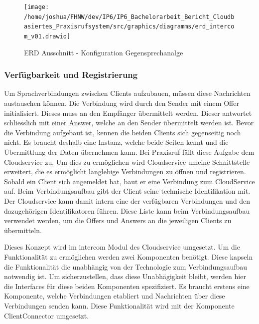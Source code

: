 \begin{figure}[h]
    \centering
    \begin{minipage}[b]{0.7\textwidth}
        \texttt{[image: /home/joshua/FHNW/dev/IP6/IP6\_Bachelorarbeit\_Bericht\_Cloudbasiertes\_Praxisrufsystem/src/graphics/diagramms/erd\_intercom\_v01.drawio]}
        \caption{ERD Ausschnitt - Konfiguration Gegensprechanalge}
    \end{minipage}
\end{figure}




\clearpage
\subsubsection*{Verfügbarkeit und Registrierung}

Um Sprachverbindungen zwischen Clients aufzubauen, müssen diese Nachrichten austauschen können.
Die Verbindung wird durch den Sender mit einem Offer initialisiert.
Dieses muss an den Empfänger übermittelt werden.
Dieser antwortet schliesslich mit einer Answer, welche an den Sender übermittelt werden ist.
Bevor die Verbindung aufgebaut ist, kennen die beiden Clients sich gegenseitig noch nicht.
Es braucht deshalb eine Instanz, welche beide Seiten kennt und die Übermittlung der Daten übernehmen kann.
Bei Praxisruf fällt diese Aufgabe dem Cloudservice zu.
Um dies zu ermöglichen wird Cloudservice umeine Schnittstelle erweitert, die es ermöglicht langlebige Verbindungen
zu öffnen und registrieren.
Sobald ein Client sich angemeldet hat, baut er eine Verbindung zum CloudService auf.
Beim Verbindungsaufbau gibt der Client seine technische Identifikation mit.
Der Cloudservice kann damit intern eine der verfügbaren Verbindungen und den dazugehörigen Identifikatoren führen.
Diese Liste kann beim Verbindungsaufbau verwendet werden, um die Offers und Answers an die jeweiligen Clients zu übermitteln.

Dieses Konzept wird im intercom Modul des Cloudservice umgesetzt.
Um die Funktionalität zu ermöglichen werden zwei Komponenten benötigt.
Diese kapseln die Funktionalität die unabhängig von der Technologie zum Verbindungsaufbau notwendig ist.
Um sicherzustellen, dass diese Unabhägigkeit bleibt, werden hier die Interfaces für diese beiden Komponenten spezifiziert.
Es braucht erstens eine Komponente, welche Verbindungen etabliert und Nachrichten über diese Verbindungen senden kann.
Diese Funktionalität wird mit der Komponente ClientConnector umgesetzt.




